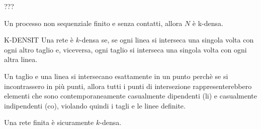 ???

Un processo non sequenziale finito e senza contatti, allora $N$ è k-densa.

K-DENSIT
Una rete è $k$-densa se, se ogni linea si interseca una singola volta con ogni altro taglio e, viceversa, ogni taglio si interseca una singola volta con ogni altra linea.

Un taglio e una linea si intersecano esattamente in un punto perchè se si incontrassero in più punti, allora tutti i punti di intersezione rappresenterebbero elementi che sono contemporaneamente casualmente dipendenti (li) e casualmente indipendenti (co), violando quindi i tagli e le linee definite.

Una rete finita è sicuramente $k$-densa.




